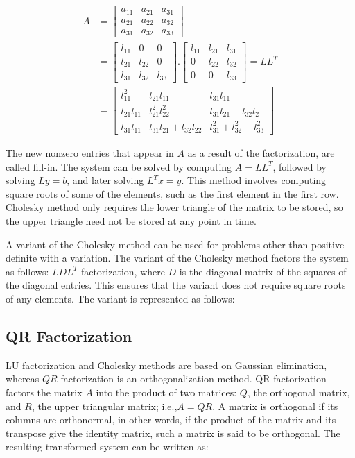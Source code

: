\begin {align*}
 A &= 
    \begin{bmatrix}
     a_{11}       & a_{21} & a_{31} \\
     a_{21}       & a_{22} & a_{32} \\
     a_{31}       & a_{32} & a_{33} 
    \end{bmatrix} \\
&= 
    \begin{bmatrix}
     l_{11}       & 0 & 0 \\
     l_{21}       & l_{22} & 0 \\
     l_{31}       & l_{32} & l_{33} 
    \end{bmatrix}
       . 
    \begin{bmatrix}
     l_{11}       & l_{21} & l_{31} \\
     0            & l_{22} & l_{32} \\
     0            & 0      & l_{33} 
    \end{bmatrix}    
    = LL^T \\
&= 
    \begin{bmatrix}
     l_{11}^2           & l_{21} l_{11}      & l_{31}l_{11} \\
     l_{21} l_{11}      & l_{21}^2 l_{22}^2  & l_{31}l_{21} + l_{32}l_{2} \\
     l_{31} l_{11}      & l_{31}l_{21} + l_{32}l_{22}      & l_{31}^2 +  l_{32}^2 + l_{33}^2
    \end{bmatrix}
\end {align*}

The new nonzero entries that appear in $A$ as a result of the factorization, are called fill-in. The system can be solved by computing $A = LL^T$, followed by solving $Ly=b$, and later solving $L^Tx = y$. This method involves computing square roots of some of the elements, such as the first element in the first row. Cholesky method only requires the lower triangle of the matrix to be stored, so the upper triangle need not be stored at any point in time. 

A variant of the Cholesky method can be used for problems other than positive definite with a variation. The variant of the Cholesky method factors the system as follows: $LDL^{T}$ factorization, where $D$ is the diagonal matrix of the squares of the diagonal entries. This ensures that the variant does not require square roots of any elements. The variant is represented as follows: 

\subsection{QR Factorization}
LU factorization and Cholesky methods are based on Gaussian elimination, whereas $QR$ factorization is an orthogonalization method. QR factorization~\cite{qr} factors the matrix $A$ into the product of two matrices: $Q$, the orthogonal matrix, and $R$, the upper triangular matrix; i.e.,$A = QR$. A matrix is orthogonal if its columns are orthonormal, in other words, if the product of the matrix and its transpose give the identity matrix, such a matrix is said to be orthogonal. The resulting transformed system can be written as:

